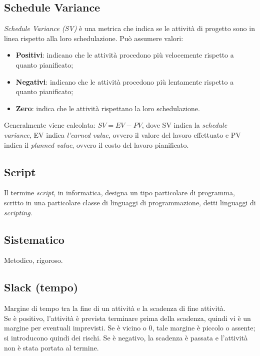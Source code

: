 	
	\newpage

	
	\subsection{Schedule Variance}
	\label{sec:schedulevariance}
	\emph{Schedule Variance (SV)} è una metrica che indica se le attività di progetto sono in linea rispetto alla loro schedulazione.
	Può assumere valori:
	\begin{itemize}
	\item \textbf{Positivi}: indicano che le attività procedono più velocemente rispetto a quanto pianificato;
	\item \textbf{Negativi}: indicano che le attività procedono più lentamente rispetto a quanto pianificato;
	\item \textbf{Zero}: indica che le attività rispettano la loro schedulazione.
	\end{itemize}
	Generalmente viene calcolata: $SV = EV - PV$,
	dove SV indica la \emph{schedule variance}, EV indica \emph{l'earned value}, ovvero il valore del lavoro effettuato e PV indica il \emph{planned value}, ovvero il costo del lavoro pianificato.


	\subsection{Script}
	\label{sec:script}
	Il termine \emph{script}, in informatica, designa un tipo particolare di programma, scritto in una particolare classe di linguaggi di programmazione, detti linguaggi di \emph{scripting}.


	\subsection{Sistematico}
	\label{sec:sistematico}
	Metodico, rigoroso.


	\subsection{Slack (tempo)}
	\label{sec:slackt}
	Margine di tempo tra la fine di un attività e la scadenza di fine attività. \\
	Se è positivo, l'attività è prevista terminare prima della scadenza, quindi vi è un margine per eventuali imprevisti. Se è vicino o 0, tale margine è piccolo o assente; si introducono quindi dei rischi. Se è negativo, la scadenza è passata e l'attività non è stata portata al termine.


